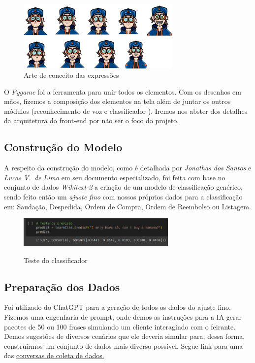 \documentclass[a4paper]{article}
\begin{document}
        \begin{figure}[!h]
            \center
            \includegraphics[width=8cm]{spreadsheet.png}
            \caption{Arte de conceito das expressões}
        \end{figure}
        
        O \emph{Pygame} foi a ferramenta para unir todos os elementos. Com os desenhos
        em mãos, fizemos a composição dos elementos na tela além de juntar os
        outros módulos (reconhecimento de voz e classificador%
        ). Iremos
        nos abster dos detalhes da arquitetura do front-end por não ser o foco
        do projeto.
        
        
        
    \subsection{Construção do Modelo}
        A respeito da construção do modelo, como é detalhada por \emph{Jonathas dos Santos}
        e \emph{Lucas V.~de Lima} em seu documento
        especializado\cite{criacao-modelo}, foi feita com base no conjunto de
        dados \emph{Wikitext-2} a criação de um modelo de classificação
        genérico, sendo feito então um \emph{ajuste fino} com nossos próprios
        dados para a classificação em: Saudação, Despedida, Ordem de Compra,
        Ordem de Reembolso ou Listagem. 

        \begin{figure}[!h]
            \center
            \includegraphics[height=1.5cm]{buyingBanana.png} \\
            \caption{\small{Teste do classificador}}
        \end{figure}
    	
    \subsection{Preparação dos Dados}
        Foi utilizado do ChatGPT para a geração de todos os dados do ajuste
        fino. Fizemos uma engenharia de prompt, onde demos as instruções para
        a IA gerar pacotes de 50 ou 100 frases simulando um cliente interagindo
        com o feirante. Demos sugestões de diversos cenários que ele deveria
        simular para, dessa forma, construirmos um conjunto de dados mais
        diverso possível. Segue link para uma das 
        \href{https://chat.openai.com/share/895c5da7-b209-4242-bace-1ce46108af37}{conversas
        de coleta de dados.}
\end{document}
